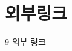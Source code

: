 \documentclass[12pt, a4paper, oneside]{book}
\let\stdsection\section
\renewcommand\section{\newpage\stdsection}
\begin{document}
	\section{ 외부링크}

9	외부 링크














\end{document}
